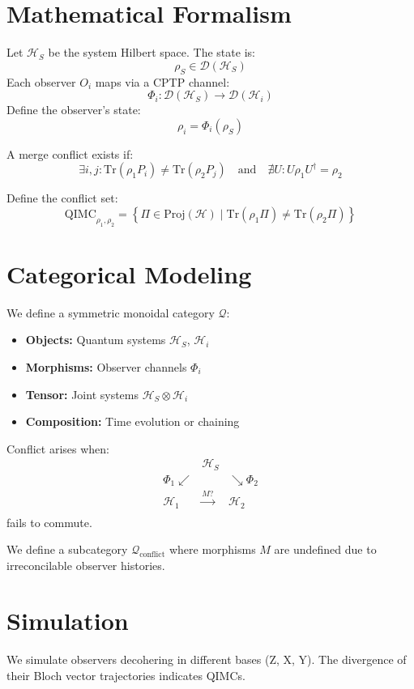 \documentclass[11pt]{article}
\begin{document}
\section{Mathematical Formalism}
Let $\mathcal{H}_S$ be the system Hilbert space. The state is:
\[
\rho_S \in \mathcal{D}(\mathcal{H}_S)
\]
Each observer $O_i$ maps via a CPTP channel:
\[
\Phi_i: \mathcal{D}(\mathcal{H}_S) \rightarrow \mathcal{D}(\mathcal{H}_i)
\]
Define the observer's state:
\[
\rho_i = \Phi_i(\rho_S)
\]

A merge conflict exists if:
\[
\exists i,j: \text{Tr}(\rho_1 P_i) \neq \text{Tr}(\rho_2 P_j) \quad \text{and} \quad \nexists U: U \rho_1 U^\dagger = \rho_2
\]

Define the conflict set:
\[
\text{QIMC}_{\rho_1, \rho_2} = \left\{ \Pi \in \text{Proj}(\mathcal{H}) \mid \text{Tr}(\rho_1 \Pi) \neq \text{Tr}(\rho_2 \Pi) \right\}
\]

\section{Categorical Modeling}
We define a symmetric monoidal category $\mathcal{Q}$:
\begin{itemize}
  \item \textbf{Objects:} Quantum systems $\mathcal{H}_S$, $\mathcal{H}_i$
  \item \textbf{Morphisms:} Observer channels $\Phi_i$
  \item \textbf{Tensor:} Joint systems $\mathcal{H}_S \otimes \mathcal{H}_i$
  \item \textbf{Composition:} Time evolution or chaining
\end{itemize}

Conflict arises when:
\[
\begin{array}{ccc}
& \mathcal{H}_S & \\
\Phi_1 \swarrow & & \searrow \Phi_2 \\
\mathcal{H}_1 & \xrightarrow[]{M?} & \mathcal{H}_2
\end{array}
\]
fails to commute.

We define a subcategory $\mathcal{Q}_{\text{conflict}}$ where morphisms $M$ are undefined due to irreconcilable observer histories.

\section{Simulation}
We simulate observers decohering in different bases (Z, X, Y). The divergence of their Bloch vector trajectories indicates QIMCs.
\end{document}
